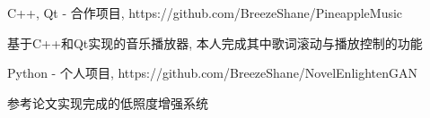 \documentclass{resume}
\begin{document}
C++, Qt - 合作项目, https://github.com/BreezeShane/PineappleMusic \newline
\begin{onehalfspacing}
基于C++和Qt实现的音乐播放器, 本人完成其中歌词滚动与播放控制的功能
\end{onehalfspacing}

Python - 个人项目, https://github.com/BreezeShane/NovelEnlightenGAN \newline
\begin{onehalfspacing}
参考论文实现完成的低照度增强系统
\end{onehalfspacing}
\end{document}
